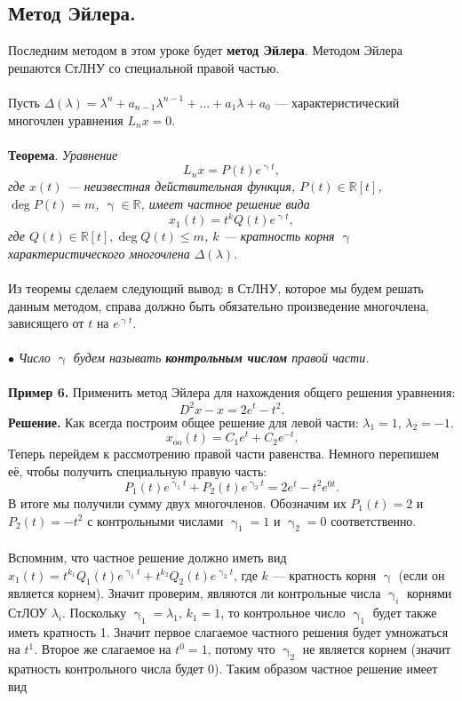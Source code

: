 \documentclass[a4paper, 12pt]{article}
\newcommand{\Rm}{\mathbb{R}}
\begin{document}
\subsection*{Метод Эйлера.}
Последним методом в этом уроке будет \textbf{метод Эйлера}. Методом Эйлера решаются СтЛНУ со специальной правой частью.\\\\
Пусть $\Delta(\lambda) = \lambda^n + a_{n-1}\lambda^{n-1} + \ldots + a_1\lambda + a_0$ --- характеристический многочлен уравнения $L_nx = 0$.\\\\
\textbf{Теорема}.
	\textit{Уравнение $$L_nx = P(t)e^{\upgamma t},$$ где $x(t)$ --- неизвестная действительная функция, $P(t)\in\Rm[t]$, $\deg P(t) = m$, $\upgamma \in \Rm$, имеет частное решение вида $$x_1(t) = t^kQ(t)e^{\upgamma t},$$ где $Q(t) \in \Rm[t], \deg Q(t) \leqslant m$, $k$ --- кратность корня $\upgamma$ характеристического многочлена $\Delta(\lambda)$.}\\\\
	Из теоремы сделаем следующий вывод: в СтЛНУ, которое мы будем решать данным методом, справа должно быть обязательно произведение многочлена, зависящего от $t$ на $e^{\upgamma t}$.\\\\
	$\bullet$ \textit{Число $\upgamma$ будем называть \textbf{контрольным числом} правой части.}\\\\
	\textbf{Пример 6.} Применить метод Эйлера для нахождения общего решения уравнения: $$D^2x - x = 2e^t - t^2.$$
	\textbf{Решение.} Как всегда построим общее решение для левой части: $\lambda_1 = 1$, $\lambda_2 = -1$.
	$$x_\text{oo}(t) = C_1e^t + C_2e^{-t}.$$
	Теперь перейдем к рассмотрению правой части равенства. Немного перепишем её, чтобы получить специальную правую часть: $$P_1(t) e^{\upgamma_1 t} + P_2(t) e^{\upgamma_2 t} = 2e^t - t^2e^{0t}.$$
	В итоге мы получили сумму двух многочленов. Обозначим их $P_1(t) = 2$ и $P_2(t) = -t^2$ с контрольными числами $\upgamma_1 = 1$ и $\upgamma_2 = 0$ соответственно.\\\\
	Вспомним, что частное решение должно иметь вид $x_1(t) = t^{k_1}Q_1(t)e^{\upgamma_1 t} + t^{k_2}Q_2(t)e^{\upgamma_2 t}$, где $k$ --- кратность корня $\upgamma$ (если он является корнем). Значит проверим, являются ли контрольные числа $\upgamma_i$ корнями СтЛОУ $\lambda_i$. Поскольку $\upgamma_1 = \lambda_1$, $k_1 = 1$, то контрольное число $\upgamma_1$ будет также иметь кратность 1. Значит первое слагаемое частного решения будет умножаться на $t^1$. Второе же слагаемое на $t^0 = 1$, потому что $\upgamma_2$ не является корнем (значит кратность контрольного числа будет 0). Таким образом частное решение имеет вид
\end{document}
